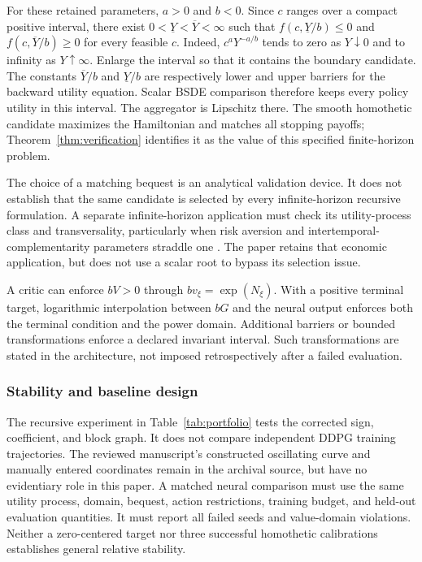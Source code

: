 \documentclass[ecta,nameyear,draft]{econsocart}
\theoremstyle{definition}
\theoremstyle{remark}
\begin{document}
For these retained parameters, $a>0$ and $b<0$. Since $c$ ranges over a compact positive interval, there exist $0<\underline Y<\overline Y<\infty$ such that $f(c,\underline Y/b)\leq0$ and $f(c,\overline Y/b)\geq0$ for every feasible $c$. Indeed, $c^aY^{-a/b}$ tends to zero as $Y\downarrow0$ and to infinity as $Y\uparrow\infty$. Enlarge the interval so that it contains the boundary candidate. The constants $\overline Y/b$ and $\underline Y/b$ are respectively lower and upper barriers for the backward utility equation. Scalar BSDE comparison therefore keeps every policy utility in this interval. The aggregator is Lipschitz there. The smooth homothetic candidate maximizes the Hamiltonian and matches all stopping payoffs; Theorem~\ref{thm:verification} identifies it as the value of this specified finite-horizon problem.

The choice of a matching bequest is an analytical validation device. It does not establish that the same candidate is selected by every infinite-horizon recursive formulation. A separate infinite-horizon application must check its utility-process class and transversality, particularly when risk aversion and intertemporal-complementarity parameters straddle one \citep{herdegen2021}. The paper retains that economic application, but does not use a scalar root to bypass its selection issue.

A critic can enforce $bV>0$ through $b v_\xi=\exp(N_\xi)$. With a positive terminal target, logarithmic interpolation between $bG$ and the neural output enforces both the terminal condition and the power domain. Additional barriers or bounded transformations enforce a declared invariant interval. Such transformations are stated in the architecture, not imposed retrospectively after a failed evaluation.

\subsubsection{Stability and baseline design}
The recursive experiment in Table~\ref{tab:portfolio} tests the corrected sign, coefficient, and block graph. It does not compare independent DDPG training trajectories. The reviewed manuscript's constructed oscillating curve and manually entered coordinates remain in the archival source, but have no evidentiary role in this paper. A matched neural comparison must use the same utility process, domain, bequest, action restrictions, training budget, and held-out evaluation quantities. It must report all failed seeds and value-domain violations. Neither a zero-centered target nor three successful homothetic calibrations establishes general relative stability.
\end{document}

